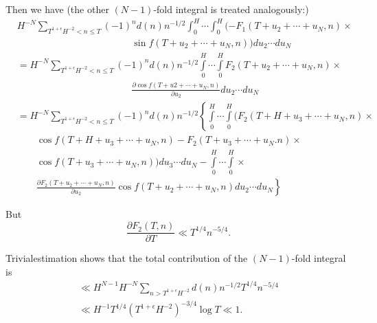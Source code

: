 Then we have (the other $(N-1)$-fold integral is treated analogously:)
{\fontsize{10}{12}\selectfont
\begin{align*}
&   H^{-N} \sum_{T^{1 + \epsilon} H^{-2} < n \leq T} (-1)^n d(n) n^{-1/2}
  \int_0^H \cdots \int_0^H (-F_1 (T+u_2 + \cdots + u_N, n)\times \\
& \hspace{5cm} \sin f(T+ u_2   + \cdots + u_N, n)) du_2 \cdots du_N\\
&   = H^{-N} \sum_{T^{1+\epsilon} H^{-2} < n \leq T} (-1)^n d(n)
  n^{-1/2} \int\limits_0^H \cdots \int\limits_0^H F_2 (T + u_2 +
  \cdots + u_N, n)\times\\
& \hspace{5cm}  \frac{\partial \cos f (T + u2 + \cdots + u_N,
    n)}{\partial u_2} du_2 \cdots du_N\\
&   = H^{-N} \sum_{T^{1 + \epsilon} H^{-2} < n \leq T} (-1)^n d(n)
  n^{-1/2} \left\{ \int\limits_0^H \cdots \int\limits_0^H (F_2 (T + H+
  u_3 + \cdots + u_N, n)\times\right. \\
& \qquad \cos f(T+ H + u_3 + \cdots + u_N, n)
  - F_2 (T+ u_3 + \cdots + u_N. n)\times \\
& \qquad  \cos f(T+ u_3 + \cdots + u_N, n))  du_3 \cdots du_N
- \int\limits_0^H \cdots \int\limits_0^H\times \\
& \qquad \left.\frac{\partial F_2 (T+ u_2
    + \cdots + u_N , n)}{\partial u_2} \cos f(T + u_2 + \cdots + u_N,
  n) du_2 \cdots du_N\right\}
\end{align*}}

But
$$
\frac{\partial F_2 (T, n)}{\partial T} \ll T^{1/4} n^{-5/4}.
$$

Trivial\pageoriginale estimation shows that the total contribution of
the $(N-1)$-fold integral is 
\begin{multline*}
  \ll H^{N-1} H^{-N} \sum_{n> T^{1+ \epsilon}H^{-2}} d(n) n^{-1/2}
  T^{1/4} n^{- 5/4}\\ 
  \ll H^{-1} T^{1/4} (T^{1+ \epsilon} H^{-2})^{-3/4}
  \log T \ll 1.
\end{multline*}

